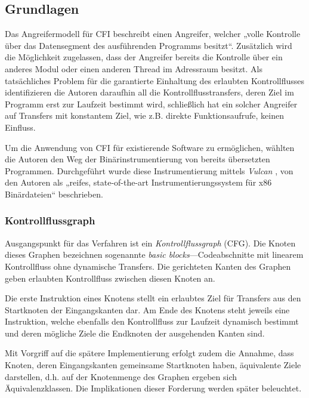 \documentclass[11pt]{article}
\begin{document}
\subsection{Grundlagen}

Das Angreifermodell für CFI beschreibt einen Angreifer, welcher „volle
Kontrolle über das Datensegment des ausführenden Programms besitzt“. Zusätzlich
wird die Möglichkeit zugelassen, dass der Angreifer bereits die Kontrolle über
ein anderes Modul oder einen anderen Thread im Adressraum besitzt. Als
tatsächliches Problem für die garantierte Einhaltung des erlaubten
Kontrollflusses identifizieren die Autoren daraufhin all die
Kontrollflusstransfers, deren Ziel im Programm erst zur Laufzeit bestimmt wird,
schließlich hat ein solcher Angreifer auf Transfers mit konstantem Ziel, wie
z.B. direkte Funktionsaufrufe, keinen Einfluss.

\label{intro-impl}

Um die Anwendung von CFI für existierende Software zu ermöglichen, wählten die
Autoren den Weg der Binärinstrumentierung von bereits übersetzten Programmen.
Durchgeführt wurde diese Instrumentierung mittels \emph{Vulcan}
\cite{edwards-vulcan}, von den Autoren als „reifes, state-of-the-art
Instrumentierungssystem für x86 Binärdateien“ beschrieben.

\subsubsection{Kontrollflussgraph}
\label{sec:cfg}

Ausgangspunkt für das Verfahren ist ein \emph{Kontrollflussgraph} (CFG). Die
Knoten dieses Graphen bezeichnen sogenannte \emph{basic blocks}—Codeabschnitte
mit linearem Kontrollfluss ohne dynamische Transfers. Die gerichteten Kanten
des Graphen geben erlaubten Kontrollfluss zwischen diesen Knoten an.

Die erste Instruktion eines Knotens stellt ein erlaubtes Ziel für Transfers aus
den Startknoten der Eingangskanten dar. Am Ende des Knotens steht jeweils eine
Instruktion, welche ebenfalls den Kontrollfluss zur Laufzeit dynamisch bestimmt
und deren mögliche Ziele die Endknoten der ausgehenden Kanten sind.

Mit Vorgriff auf die spätere Implementierung erfolgt zudem die Annahme, dass
Knoten, deren Eingangskanten gemeinsame Startknoten haben, äquivalente Ziele
darstellen, d.h. auf der Knotenmenge des Graphen ergeben sich
Äquivalenzklassen. Die Implikationen dieser Forderung werden später beleuchtet.
\end{document}
